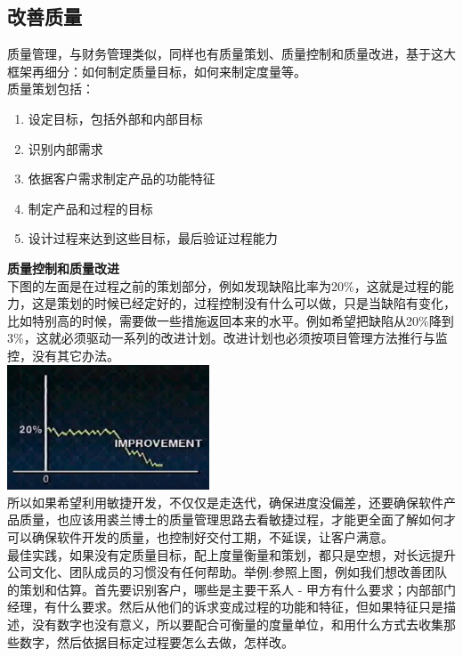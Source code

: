\hypertarget{ux6539ux5584ux8d28ux91cf}{%
\subsection{改善质量}\label{ux6539ux5584ux8d28ux91cf}}

质量管理，与财务管理类似，同样也有质量策划、质量控制和质量改进，基于这大框架再细分：如何制定质量目标，如何来制定度量等。\\
质量策划包括：

\begin{enumerate}
\tightlist
\item
  设定目标，包括外部和内部目标
\item
  识别内部需求
\item
  依据客户需求制定产品的功能特征
\item
  制定产品和过程的目标
\item
  设计过程来达到这些目标，最后验证过程能力\\
\end{enumerate}

\textbf{质量控制和质量改进}\\
下图的左面是在过程之前的策划部分，例如发现缺陷比率为20\%，这就是过程的能力，这是策划的时候已经定好的，过程控制没有什么可以做，只是当缺陷有变化，比如特别高的时候，需要做一些措施返回本来的水平。例如希望把缺陷从20\%降到3\%，这就必须驱动一系列的改进计划。改进计划也必须按项目管理方法推行与监控，没有其它办法。\\

\includegraphics[width=6cm]{JuranImprovementScreenshot_2022-10-23_211444.jpg}\\

所以如果希望利用敏捷开发，不仅仅是走迭代，确保进度没偏差，还要确保软件产品质量，也应该用裘兰博士的质量管理思路去看敏捷过程，才能更全面了解如何才可以确保软件开发的质量，也控制好交付工期，不延误，让客户满意。\\
最佳实践，如果没有定质量目标，配上度量衡量和策划，都只是空想，对长远提升公司文化、团队成员的习惯没有任何帮助。举例:参照上图，例如我们想改善团队的策划和估算。首先要识别客户，哪些是主要干系人
-
甲方有什么要求；内部部门经理，有什么要求。然后从他们的诉求变成过程的功能和特征，但如果特征只是描述，没有数字也没有意义，所以要配合可衡量的度量单位，和用什么方式去收集那些数字，然后依据目标定过程要怎么去做，怎样改。

